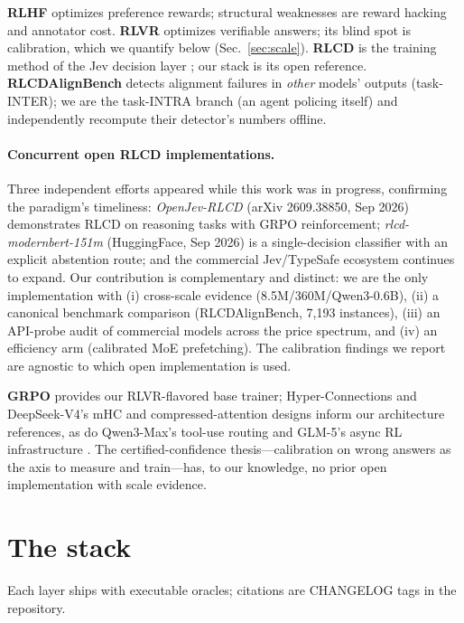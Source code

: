 \documentclass[11pt]{article}
\begin{document}
\textbf{RLHF} \citep{ouyang2022rlhf} optimizes preference rewards;
structural weaknesses are reward hacking and annotator cost.
\textbf{RLVR} \citep{deepseekr1} optimizes verifiable answers; its blind
spot is calibration, which we quantify below (Sec.~\ref{sec:scale}).
\textbf{RLCD} is the training method of the Jev decision layer
\citep{jev}; our stack is its open reference. \textbf{RLCDAlignBench}
\citep{rlcdalignbench} detects alignment failures in \emph{other}
models' outputs (task-INTER); we are the task-INTRA branch (an agent
policing itself) and independently recompute their detector's numbers
offline. \paragraph{Concurrent open RLCD implementations.}
Three independent efforts appeared while this work was in progress,
confirming the paradigm's timeliness: \emph{OpenJev-RLCD} (arXiv
2609.38850, Sep 2026) demonstrates RLCD on reasoning tasks with GRPO
reinforcement; \emph{rlcd-modernbert-151m} (HuggingFace, Sep 2026) is a
single-decision classifier with an explicit abstention route; and the
commercial Jev/TypeSafe ecosystem continues to expand. Our contribution
is complementary and distinct: we are the only implementation with
(i) cross-scale evidence (8.5M/360M/Qwen3-0.6B), (ii) a canonical
benchmark comparison (RLCDAlignBench, 7,193 instances), (iii) an
API-probe audit of commercial models across the price spectrum, and
(iv) an efficiency arm (calibrated MoE prefetching). The calibration
findings we report are agnostic to which open implementation is used.

\textbf{GRPO} \citep{shao2024grpo} provides our RLVR-flavored
base trainer; Hyper-Connections \citep{hu2025hc} and DeepSeek-V4's mHC
and compressed-attention designs \citep{deepseekv4} inform our
architecture references, as do Qwen3-Max's tool-use routing
\citep{qwen3max} and GLM-5's async RL infrastructure \citep{glm5}. The
certified-confidence thesis---calibration on wrong answers as the axis
to measure and train---has, to our knowledge, no prior open
implementation with scale evidence.

\section{The stack}
\label{sec:stack}

Each layer ships with executable oracles; citations are CHANGELOG tags
in the repository.
\end{document}
